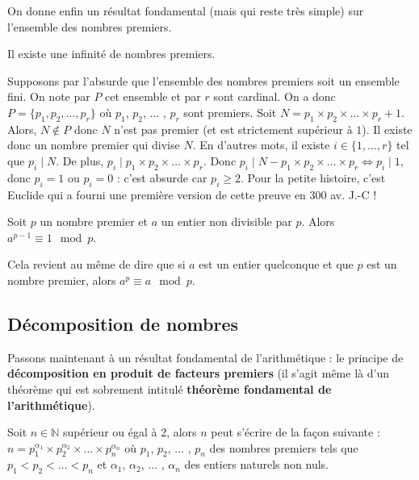 	On donne enfin un résultat fondamental (mais qui reste très simple) sur l'ensemble des nombres premiers.

	\begin{formula}
		Il existe une infinité de nombres premiers.
	\end{formula}

	\begin{demonstration}
		Supposons par l'absurde que l'ensemble des nombres premiers soit un ensemble fini. On note par $P$ cet ensemble et par $r$ sont cardinal. On a donc $P = \{p_1, p_2, \dots, p_r\}$ où $p_1$, $p_2$, ... , $p_r$ sont premiers. \newpar
		Soit $N = p_1 \times p_2 \times \dots \times p_r + 1$. Alors, $N \notin P$ donc $N$ n'est pas premier (et est strictement supérieur à $1$). Il existe donc un nombre premier qui divise $N$.
		\newpar
		En d'autres mots, il existe $i \in \{1, \dots, r\}$ tel que $p_i \mid N$. De plus, $p_i \mid p_1 \times p_2 \times \dots \times p_r$.
		\newpar
		Donc $p_i \mid N -  p_1 \times p_2 \times \dots \times p_r \iff p_i \mid 1$, donc $p_i = 1$ ou $p_i = 0$ : c'est absurde car $p_i \geq 2$.
		\newpar
		Pour la petite histoire, c'est Euclide qui a fourni une première version de cette preuve en 300 av. J.-C !
	\end{demonstration}

	\begin{formula}
		\label{thm:fermat}
		Soit $p$ un nombre premier et $a$ un entier non divisible par $p$. Alors $a^{p-1} \equiv 1 \mod p$.
	\end{formula}

	\begin{tip}
		Cela revient au même de dire que si $a$ est un entier quelconque et que $p$ est un nombre premier, alors $a^p \equiv a \mod p$.
	\end{tip}

	\subsection{Décomposition de nombres}

	Passons maintenant à un résultat fondamental de l'arithmétique : le principe de \textbf{décomposition en produit de facteurs premiers} (il s'agit même là d'un théorème qui est sobrement intitulé \textbf{théorème fondamental de l'arithmétique}).

	\begin{formula}
		Soit $n \in \mathbb{N}$ supérieur ou égal à 2, alors $n$ peut s'écrire de la façon suivante :
		\newpar
		$n = p_{1}^{\alpha_1} \times p_{2}^{\alpha_2} \times \dots \times p_{n}^{\alpha_n}$
		\newpar
		où $p_1$, $p_2$, ... , $p_n$ des nombres premiers tels que $p_1 < p_2 < \dots < p_n$ et $\alpha_1$, $\alpha_2$, ... , $\alpha_n$ des entiers naturels non nuls.
	\end{formula}

